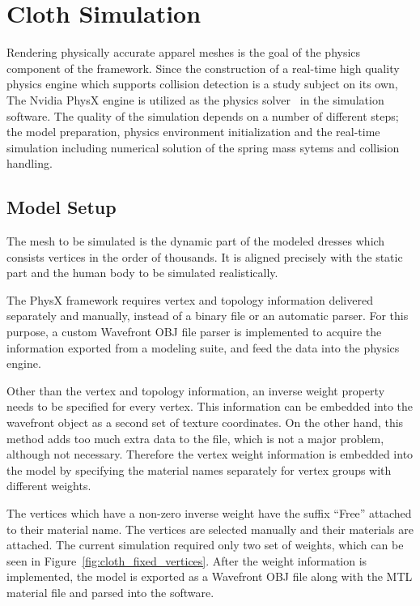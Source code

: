 \chapter{Cloth Simulation}
\label{chapter_cloth_simulation}

Rendering physically accurate apparel meshes is the goal of the physics component of the framework. Since the construction of a real-time high quality physics engine which supports collision detection is a study subject on its own, The Nvidia PhysX engine is utilized as the physics solver~\cite{Kim2011} in the simulation software. The quality of the simulation depends on a number of different steps; the model preparation, physics environment initialization and the real-time simulation including numerical solution of the spring mass sytems and collision handling. 

\section{Model Setup}
The mesh to be simulated is the dynamic part of the modeled dresses which consists vertices in the order of thousands. It is aligned precisely with the static part and the human body to be simulated realistically. 

The PhysX framework requires vertex and topology information delivered separately and manually, instead of a binary file or an automatic parser. For this purpose, a custom Wavefront OBJ file parser is implemented to acquire the information exported from a modeling suite, and feed the data into the physics engine. 

Other than the vertex and topology information, an inverse weight property needs to be specified for every vertex.  This information can be embedded into the wavefront object as a second set of texture coordinates. On the other hand, this method adds too much extra data to the file, which is not a major problem, although not necessary. Therefore the vertex weight information is embedded into the model by specifying the material names separately for vertex groups with different weights. 

The vertices which have a non-zero inverse weight have the suffix ``Free'' attached to their material name. The vertices are selected manually and their materials are attached.  The current simulation required only two set of weights, which can be seen in Figure~\ref{fig:cloth_fixed_vertices}. After the weight information is implemented, the model is exported as a Wavefront OBJ file along with the MTL material file and parsed into the software.

